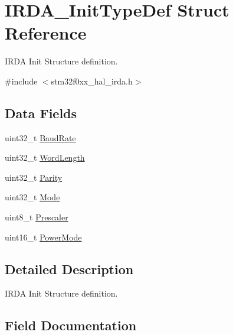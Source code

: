 \hypertarget{struct_i_r_d_a___init_type_def}{}\section{I\+R\+D\+A\+\_\+\+Init\+Type\+Def Struct Reference}
\label{struct_i_r_d_a___init_type_def}


I\+R\+DA Init Structure definition.  




{\ttfamily \#include $<$stm32f0xx\+\_\+hal\+\_\+irda.\+h$>$}

\subsection*{Data Fields}
\begin{DoxyCompactItemize}
\item 
uint32\+\_\+t \hyperlink{struct_i_r_d_a___init_type_def_aaad609733f3fd8146c8745e953a91b2a}{Baud\+Rate}
\item 
uint32\+\_\+t \hyperlink{struct_i_r_d_a___init_type_def_ae5e60b9a021fe0009588fc86c7584a5a}{Word\+Length}
\item 
uint32\+\_\+t \hyperlink{struct_i_r_d_a___init_type_def_a1d60a99b8f3965f01ab23444b154ba79}{Parity}
\item 
uint32\+\_\+t \hyperlink{struct_i_r_d_a___init_type_def_a0ffc93ec511ed9cf1663f6939bd3e839}{Mode}
\item 
uint8\+\_\+t \hyperlink{struct_i_r_d_a___init_type_def_a5c9d1e760b400d2502c03b0391606f90}{Prescaler}
\item 
uint16\+\_\+t \hyperlink{struct_i_r_d_a___init_type_def_ad999103a24bf9607c6c44c75f7b30013}{Power\+Mode}
\end{DoxyCompactItemize}


\subsection{Detailed Description}
I\+R\+DA Init Structure definition. 

\subsection{Field Documentation}
\mbox{\label{struct_i_r_d_a___init_type_def_aaad609733f3fd8146c8745e953a91b2a}} 
